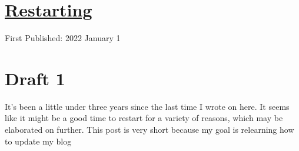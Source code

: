 \documentclass[12pt]{article}[titlepage]
\newcommand{\1}{\={a}}
\newcommand{\2}{\={e}}
\newcommand{\3}{\={\i}}
\newcommand{\4}{\=o}
\newcommand{\5}{\=u}
\newcommand{\6}{\={A}}
\renewcommand{\,}{\textsuperscript{,}}
\begin{document}
\doublespacing
\section{\href{restarting.html}{Restarting}}
First Published: 2022 January 1
\section{Draft 1}
It's been a little under three years since the last time I wrote on here.
It seems like it might be a good time to restart for a variety of reasons, which may be elaborated on further.
This post is very short because my goal is relearning how to update my blog
\end{document}
